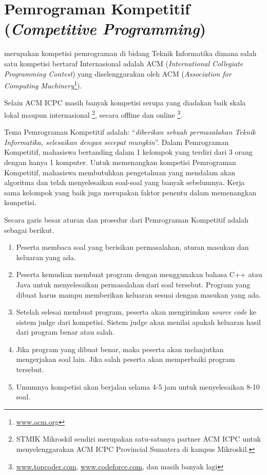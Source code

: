 \newpage
\section{Pemrograman Kompetitif (\textit{Competitive Programming})}

 merupakan kompetisi pemrograman di bidang Teknik Informatika dimana salah satu kompetisi bertaraf Internasional adalah ACM (\textit{International Collegiate Programming Contest}) yang diselenggarakan oleh ACM (\textit{Association for Computing Machinery}\footnote{\url{www.acm.org}}). 

Selain ACM ICPC masih banyak kompetisi serupa yang diadakan baik skala lokal maupun internasional \footnote{STMIK Mikroskil sendiri merupakan satu-satunya partner ACM ICPC untuk menyelenggarakan ACM ICPC Provincial Sumatera di kampus Mikroskil.}, secara offline dan online \footnote{\url{www.topcoder.com}, \url{www.codeforce.com}, dan masih banyak lagi}. 

Tema Pemrograman Kompetitif adalah: ``\textit{diberikan sebuah permasalahan Teknik Informatika, selesaikan dengan secepat mungkin}''. Dalam Pemrograman Kompetitif, mahasiswa bertanding dalam 1 kelompok yang terdiri dari 3 orang dengan hanya 1 komputer. Untuk memenangkan kompetisi Pemrograman Kompetitif, mahasiswa membutuhkan pengetahuan yang mendalam akan algoritma dan telah menyelesaikan soal-soal yang banyak sebelumnya. Kerja sama kelompok yang baik juga merupakan faktor penentu dalam memenangkan kompetisi.

Secara garis besar aturan dan prosedur dari Pemrograman Kompetitif adalah sebagai berikut.
\begin{enumerate}
	\item Peserta membaca soal yang berisikan permasalahan, aturan masukan dan keluaran yang ada.
	\item Peserta kemudian membuat program dengan menggunakan bahasa C++ atau Java untuk menyelesaikan permasalahan dari soal tersebut. Program yang dibuat harus mampu memberikan keluaran sesuai dengan masukan yang ada.
	\item Setelah selesai membuat program, peserta akan mengirimkan \textit{source code} ke sistem judge dari kompetisi. Sistem judge akan menilai apakah keluaran hasil dari program benar atau salah. 
	\item Jika program yang dibuat benar, maka peserta akan melanjutkan mengerjakan soal lain. Jika salah peserta akan memperbaiki program tersebut.
	\item Umumnya kompetisi akan berjalan selama 4-5 jam untuk menyelesaikan 8-10 soal.
\end{enumerate}

